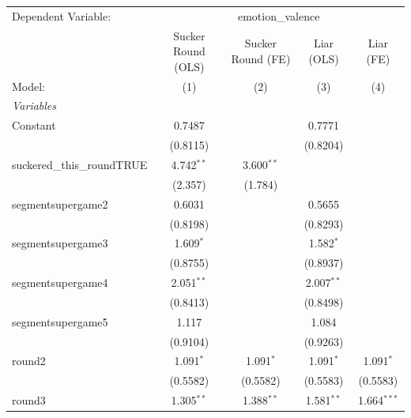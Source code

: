 
\begingroup
\centering
\begin{tabular}{lcccc}
   \tabularnewline \midrule \midrule
   Dependent Variable: & \multicolumn{4}{c}{emotion\_valence}\\
                               & Sucker Round (OLS) & Sucker Round (FE) & Liar (OLS)    & Liar (FE) \\   
   Model:                      & (1)                & (2)               & (3)           & (4)\\  
   \midrule
   \emph{Variables}\\
   Constant                    & 0.7487             &                   & 0.7771        &   \\   
                               & (0.8115)           &                   & (0.8204)      &   \\   
   suckered\_this\_roundTRUE   & 4.742$^{**}$       & 3.600$^{**}$      &               &   \\   
                               & (2.357)            & (1.784)           &               &   \\   
   segmentsupergame2           & 0.6031             &                   & 0.5655        &   \\   
                               & (0.8198)           &                   & (0.8293)      &   \\   
   segmentsupergame3           & 1.609$^{*}$        &                   & 1.582$^{*}$   &   \\   
                               & (0.8755)           &                   & (0.8937)      &   \\   
   segmentsupergame4           & 2.051$^{**}$       &                   & 2.007$^{**}$  &   \\   
                               & (0.8413)           &                   & (0.8498)      &   \\   
   segmentsupergame5           & 1.117              &                   & 1.084         &   \\   
                               & (0.9104)           &                   & (0.9263)      &   \\   
   round2                      & 1.091$^{*}$        & 1.091$^{*}$       & 1.091$^{*}$   & 1.091$^{*}$\\   
                               & (0.5582)           & (0.5582)          & (0.5583)      & (0.5583)\\   
   round3                      & 1.305$^{**}$       & 1.388$^{**}$      & 1.581$^{**}$  & 1.664$^{***}$\\   

\end{tabular}
